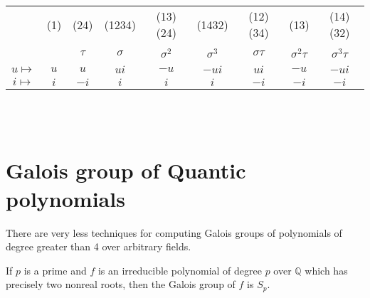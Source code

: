 \begin{tabular}{|c|c|c|c|c|c|c|c|c|}
  \hline
  \ & (1) & (24) & (1234) & (13)(24) & (1432) & (12)(34) & (13) & (14)(32) \\
  \ &  & \(\tau\)  & \(\sigma\) & \({\sigma}^2\) & \({\sigma}^3\) & \(\sigma \tau\) & \({\sigma}^2 \tau\) & \({\sigma}^3 \tau\) \\
  \hline
  \(u \mapsto\) & \(u\) & \(u\) & \(ui\) & \(-u\) & \(-ui\) & \(ui\) & \(-u\) & \(-ui\) \\
  \(i \mapsto\) & \(i\) & \(-i\) & \(i\) & \(i\) & \(i\) & \(-i\) & \(-i\) & \(-i\) \\
  \hline
\end{tabular}
\\ \\

\clearpage

\section{Galois group of Quantic polynomials}
There are very less techniques for computing Galois groups of polynomials of degree greater than 4 over arbitrary fields.

\begin{theorem}
If \(p\) is a prime and \(f\) is an irreducible polynomial of degree \(p\) over \(\mathbb{Q}\) which has precisely two nonreal roots, then the Galois group of \(f\) is \(S_p\).
\end{theorem}

